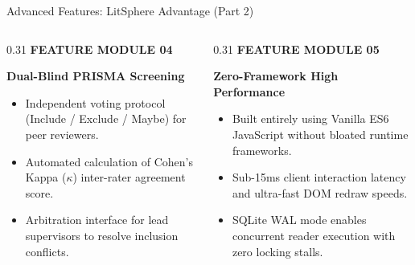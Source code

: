 \documentclass[aspectratio=169,10pt]{beamer}
\begin{document}
\begin{frame}{Advanced Features: LitSphere Advantage (Part 2)}
\vspace{-0.15cm}
\begin{columns}[T]
  \begin{column}{0.31\textwidth}
    {\fontsize{6.8pt}{8.5pt}\selectfont\bfseries\color{SubText} FEATURE MODULE 04}\par\vspace{2pt}
    {\fontsize{9.5pt}{11.5pt}\selectfont\bfseries\color{DarkText} Dual-Blind PRISMA Screening}\par\vspace{4pt}
    {\fontsize{7.2pt}{9.2pt}\selectfont\color{DarkText}
    \begin{itemize}
      \item Independent voting protocol (Include / Exclude / Maybe) for peer reviewers.
      \item Automated calculation of Cohen's Kappa ($\kappa$) inter-rater agreement score.
      \item Arbitration interface for lead supervisors to resolve inclusion conflicts.
    \end{itemize}}
  \end{column}

  \begin{column}{0.31\textwidth}
    {\fontsize{6.8pt}{8.5pt}\selectfont\bfseries\color{SubText} FEATURE MODULE 05}\par\vspace{2pt}
    {\fontsize{9.5pt}{11.5pt}\selectfont\bfseries\color{DarkText} Zero-Framework High Performance}\par\vspace{4pt}
    {\fontsize{7.2pt}{9.2pt}\selectfont\color{DarkText}
    \begin{itemize}
      \item Built entirely using Vanilla ES6 JavaScript without bloated runtime frameworks.
      \item Sub-15ms client interaction latency and ultra-fast DOM redraw speeds.
      \item SQLite WAL mode enables concurrent reader execution with zero locking stalls.
    \end{itemize}}
  \end{column}


\end{columns}
\end{frame}
\end{document}
